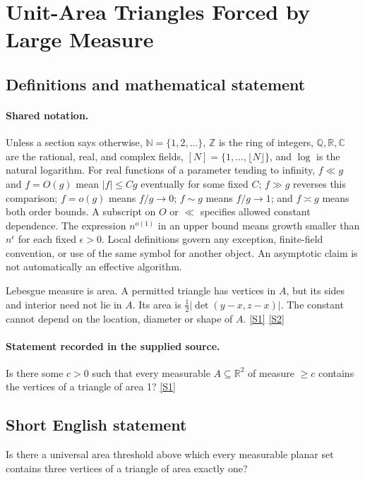 \documentclass[11pt,a4paper]{article}
\newcommand{\N}{\mathbb{N}}
\newcommand{\Z}{\mathbb{Z}}
\newcommand{\Q}{\mathbb{Q}}
\newcommand{\R}{\mathbb{R}}
\newcommand{\C}{\mathbb{C}}
\newcommand{\sref}[2]{\hyperlink{source:#1:#2}{[S#2]}}
\begin{document}
\section{Unit-Area Triangles Forced by Large Measure}\label{statement}


\subsection{Definitions and mathematical statement}

\paragraph{Shared notation.}Unless a section says otherwise, $\N=\{1,2,\ldots\}$,
$\Z$ is the ring of integers, $\Q,\R,\C$ are the rational, real, and complex
fields, $[N]=\{1,\ldots,\lfloor N\rfloor\}$, and $\log$ is the natural
logarithm. For real functions of a parameter tending to infinity,
$f\ll g$ and $f=O(g)$ mean $|f|\leq Cg$ eventually for some fixed $C$;
$f\gg g$ reverses this comparison; $f=o(g)$ means $f/g\to0$;
$f\sim g$ means $f/g\to1$; and $f\asymp g$ means both order bounds.
A subscript on $O$ or $\ll$ specifies allowed constant dependence.
The expression $n^{o(1)}$ in an upper bound means growth smaller than
$n^\epsilon$ for each fixed $\epsilon>0$. Local definitions govern any
exception, finite-field convention, or use of the same symbol for another
object. An asymptotic claim is not automatically an effective algorithm.



Lebesgue measure is area. A permitted triangle has vertices in $A$, but its sides and interior need not lie in $A$. Its area is $\tfrac12|\det(y-x,z-x)|$. The constant cannot depend on the location, diameter or shape of $A$. \sref{statement}{1} \sref{statement}{2}

\paragraph{Statement recorded in the supplied source.}
Is there some $c>0$ such that every measurable $A\subseteq \mathbb{R}^2$ of measure $\geq c$ contains the vertices of a triangle of area 1? \sref{statement}{1}

\subsection{Short English statement}

Is there a universal area threshold above which every measurable planar set contains three vertices of a triangle of area exactly one?
\end{document}
